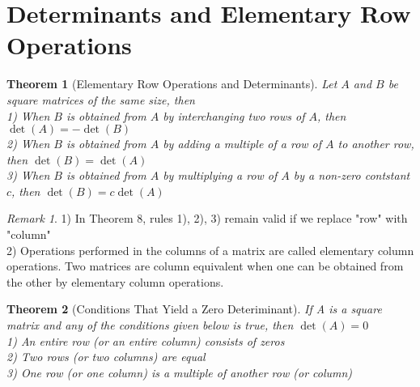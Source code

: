 \documentclass{jhwhw}
\newtheorem{theorem}{Theorem}
\theoremstyle{definition}
\theoremstyle{remark}
\newtheorem*{remark}{Remark}
\theoremstyle{example}
\begin{document}
\section{Determinants and Elementary Row Operations}
\begin{theorem}[Elementary Row Operations and Determinants] Let \(A\) and \(B\) be square matrices of the same size, then\\
1) When \(B\) is obtained from \(A\) by interchanging two rows of \(A\), then \(\det(A) = - \det(B)\)\\
2) When \(B\) is obtained from \(A\) by adding a multiple of a row of \(A\) to another row, then \(\det(B) = \det(A)\)\\
3) When \(B\) is obtained from \(A\) by multiplying a row of \(A\) by a non-zero contstant \(c\), then \(\det(B) = c \det(A)\) \end{theorem}
\begin{remark} 1) In Theorem 8, rules 1), 2), 3) remain valid if we replace "row" with "column"\\
2) Operations performed in the columns of a matrix are called elementary column operations. Two matrices are column equivalent when one can be obtained from the other by elementary column operations.\end{remark}
\begin{theorem}[Conditions That Yield a Zero Deteriminant] If A is a square matrix and any of the conditions given below is true, then \(\det(A)=0\)\\
1) An entire row (or an entire column) consists of zeros\\
2) Two rows (or two columns) are equal\\
3) One row (or one column) is a multiple of another row (or column) \end{theorem}
\end{document}
